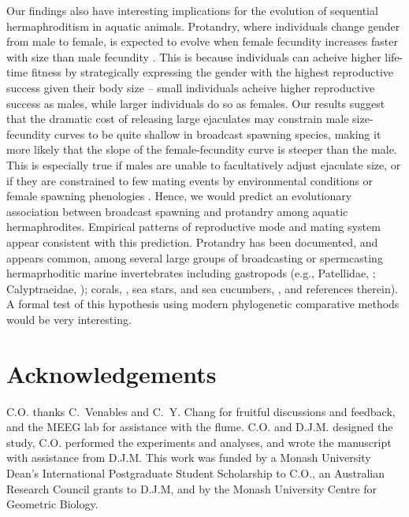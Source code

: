 \documentclass{article}
\begin{document}
Our findings also have interesting implications for the evolution of sequential hermaphroditism in aquatic animals. Protandry, where individuals change gender from male to female, is expected to evolve when female fecundity increases faster with size than male fecundity \citep{Ghiselin1969,Warner1975,Warner1988,MundayWarner2006}. This is because individuals can acheive higher life-time fitness by strategically expressing the gender with the highest reproductive success given their body size -- small individuals acheive higher reproductive success as males, while larger individuals do so as females. Our results suggest that the dramatic cost of releasing large ejaculates may constrain male size-fecundity curves to be quite shallow in broadcast spawning species, making it more likely that the slope of the female-fecundity curve is steeper than the male. This is especially true if males are unable to facultatively adjust ejaculate size, or if they are constrained to few mating events by environmental conditions or female spawning phenologies \citep{Olito2015,Olito2017}. Hence, we would predict an evolutionary association between broadcast spawning and protandry among aquatic hermaphrodites. Empirical patterns of reproductive mode and mating system appear consistent with this prediction. Protandry has been documented, and appears common, among several large groups of broadcasting or spermcasting hermaprhoditic marine invertebrates including gastropods (e.g., Patellidae, \citealt{QuesneHawkins2006}; Calyptraeidae, \citealt{Coe1936}); corals, \citealt{LoyaSakai2008}, sea stars, and sea cucumbers, \citealt{Sewell1994}, and references therein). A formal test of this hypothesis using modern phylogenetic comparative methods would be very interesting.



\section*{Acknowledgements}
C.O. thanks C.~Venables and C.~Y. Chang for fruitful discussions and feedback, and the MEEG lab for assistance with the flume. C.O. and D.J.M. designed the study, C.O. performed the experiments and analyses, and wrote the manuscript with assistance from D.J.M. This work was funded by a Monash University Dean's International Postgraduate Student Scholarship to C.O., an Australian Research Council grants to D.J.M, and by the Monash University Centre for Geometric Biology.

\newpage{}
\end{document}
